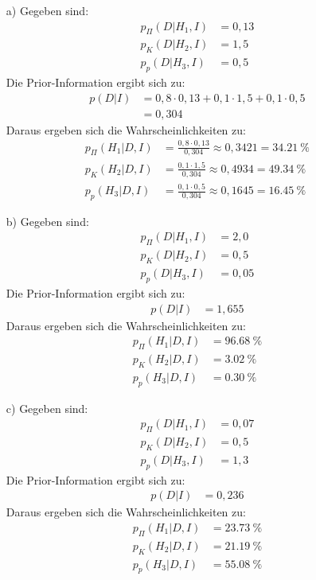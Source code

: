 \begin{itemize}
	\item[a)]
		Gegeben sind:
		\begin{align*}
			p_\Pi(D|H_1,I) &= 0,13	\\
			p_K(D|H_2,I) &= 1,5	\\
			p_p(D|H_3,I) &= 0,5
		\end{align*}
		Die Prior-Information ergibt sich zu:
		\begin{align*}
			p(D|I) &= 0,8 \cdot 0,13 + 0,1 \cdot 1,5  + 0,1 \cdot 0,5	\\
				&= 0,304
		\end{align*}
		Daraus ergeben sich die Wahrscheinlichkeiten zu:
		\begin{align*}
			p_\Pi(H_1|D,I) &= \frac{0,8 \cdot 0,13}{0,304} \approx 0,3421 = \SI{34,21}{\percent}	\\
			p_K(H_2|D,I) &= \frac{0,1 \cdot 1,5}{0,304} \approx 0,4934 = \SI{49,34}{\percent}	\\	
			p_p(H_3|D,I) &= \frac{0,1 \cdot 0,5}{0,304} \approx 0,1645 = \SI{16,45}{\percent}
		\end{align*}
	
	\item[b)]
		Gegeben sind:
		\begin{align*}
			p_\Pi(D|H_1,I) &= 2,0	\\
			p_K(D|H_2,I) &= 0,5	\\
			p_p(D|H_3,I) &= 0,05
		\end{align*}
		Die Prior-Information ergibt sich zu:
		\begin{align*}
			p(D|I) &= 1,655
		\end{align*}
		Daraus ergeben sich die Wahrscheinlichkeiten zu:
		\begin{align*}
			p_\Pi(H_1|D,I) & = \SI{96,68}{\percent}	\\
			p_K(H_2|D,I) & =  \SI{3,02}{\percent}	\\	
			p_p(H_3|D,I) &=  \SI{0,30}{\percent}
		\end{align*}
	
		
	\item[c)]
		Gegeben sind:
		\begin{align*}
			p_\Pi(D|H_1,I) &= 0,07	\\
			p_K(D|H_2,I) &= 0,5	\\
			p_p(D|H_3,I) &= 1,3
		\end{align*}
		Die Prior-Information ergibt sich zu:
		\begin{align*}
			p(D|I) &= 0,236
		\end{align*}
		Daraus ergeben sich die Wahrscheinlichkeiten zu:
		\begin{align*}
			p_\Pi(H_1|D,I) & = \SI{23,73}{\percent}	\\
			p_K(H_2|D,I) & = \SI{21,19}{\percent}	\\	
			p_p(H_3|D,I) &= \SI{55,08}{\percent}
		\end{align*}
	
\end{itemize}